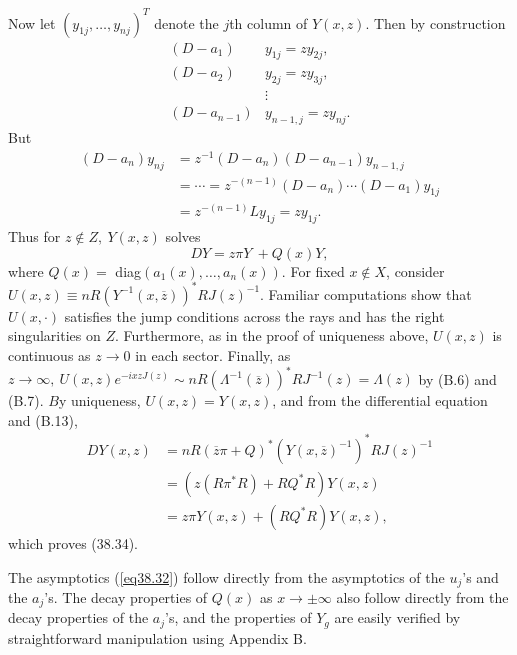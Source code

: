 \documentclass{surv-l}
\theoremstyle{plain}
\theoremstyle{definition}
\numberwithin{equation}{chapter}
\begin{document}
Now let $(y_{1j},\ldots,y_{nj})^{T}$ denote the $j$th column of $Y(x, z)$. Then by construction
\begin{align*}
(D-a_{1})&y_{1j}=zy_{2j},\\
(D-a_{2})&y_{2j}=zy_{3j},\\
&\vdots\\
(D-a_{n-1})&y_{n-1,j}=zy_{nj}.
\end{align*}
But
\begin{align*}
(D-a_{n})y_{nj}&=z^{-1}(D-a_{n})(D-a_{n-1})y_{n-1,j}\\
&=\cdots= z^{-(n-1)}(D-a_{n})\cdots(D-a_{1})y_{1j}\\
&=z^{-(n-1)}Ly_{1j}= zy_{1j}.
\end{align*}
Thus for $z\not\in Z,\ Y(x, z)$ solves
\begin{equation*}
DY=z\pi Y\ +Q(x)Y,
\end{equation*}
where $Q(x)=$ diag$(a_{1}(x),\ldots,a_{n}(x))$. For fixed $ x\not\in X$, consider $ U(x, z)\equiv nR(Y^{-1}(x,\overline{z}))^{*}RJ(z)^{-1}$. Familiar computations show that $U(x,\cdot)$ satisfies the jump conditions across the rays and has the right singularities on $Z$. Furthermore, as in the proof of uniqueness above, $U(x,z)$ is continuous as $z\rightarrow 0$ in each sector. Finally, as $ z\rightarrow\infty,\ U(x, z)e^{-ixzJ(z)}\sim nR(\Lambda^{-1}(\overline{z}))^{*}RJ^{-1}(z)=\Lambda(z)$ by (B.6) and (B.7). $B$y uniqueness, $U(x,z)=Y(x, z)$, and from the differential equation and (B.13),
\begin{align*}
DY(x, z)&=nR(\overline{z}\pi+Q)^{*}(Y(x,\overline{z})^{-1})^{*}RJ(z)^{-1}\\
&=(z(R\pi^{*}R)+RQ^{*}R)Y(x, z)\\
&=z\pi Y(x,z)+(RQ^{*}R)Y(x, z),
\end{align*}
which proves (38.34).

The asymptotics (\ref{eq38.32}) follow directly from the asymptotics of the $u_{j}$'s and the $a_{j}$'s. The decay properties of $Q(x)$ as $x \rightarrow\pm\infty$ also follow directly from the decay properties of the $a_{j}$'s, and the properties of $Y_{g}$ are easily verified by straightforward manipulation using Appendix B.
\end{document}
